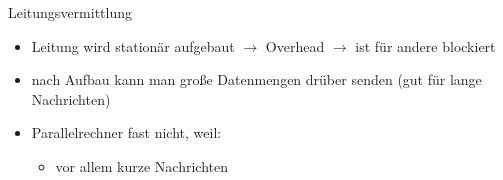 Leitungsvermittlung
\begin{itemize}
	\item Leitung wird stationär aufgebaut $\to$ Overhead $\to$ ist für andere blockiert
	\item nach Aufbau kann man große Datenmengen drüber senden (gut für lange Nachrichten)
	\item Parallelrechner fast nicht, weil:
	\begin{itemize}
		\item vor allem kurze Nachrichten
	\end{itemize}
\end{itemize}
